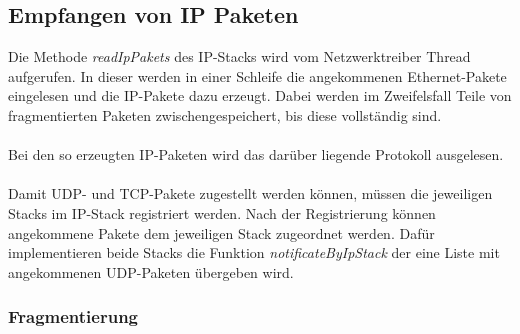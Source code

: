 \subsection{Empfangen von IP Paketen}

Die Methode \textit{readIpPakets} des IP-Stacks wird vom Netzwerktreiber Thread aufgerufen. In dieser werden in einer Schleife die angekommenen Ethernet-Pakete eingelesen und die IP-Pakete dazu erzeugt. Dabei werden im Zweifelsfall Teile von fragmentierten Paketen zwischengespeichert, bis diese vollständig sind. \\\\
Bei den so erzeugten IP-Paketen wird das darüber liegende Protokoll ausgelesen.\\\\
Damit UDP- und TCP-Pakete zugestellt werden können, müssen die jeweiligen Stacks im IP-Stack registriert werden. Nach der Registrierung können angekommene  Pakete dem jeweiligen Stack zugeordnet werden. Dafür implementieren beide Stacks die Funktion \textit{notificateByIpStack} der eine Liste mit angekommenen UDP-Paketen übergeben wird. 

\subsubsection{Fragmentierung}

